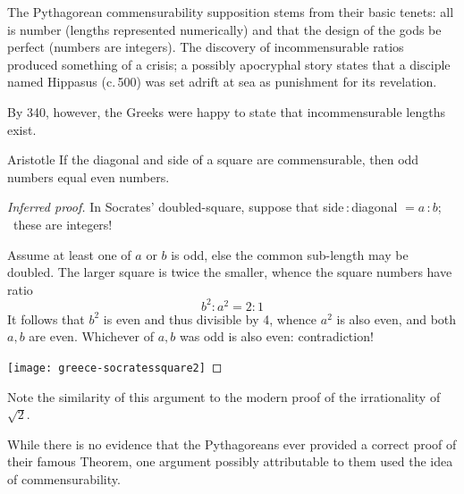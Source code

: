 The Pythagorean commensurability supposition stems from their basic tenets: all is number (lengths represented numerically) and that the design of the gods be perfect (numbers are integers). The discovery of incommensurable ratios produced something of a crisis; a possibly apocryphal story states that a disciple named Hippasus (c.\,500\BC) was set adrift at sea as punishment for its revelation.\smallbreak %

By 340\BC, however, the Greeks were happy to state that incommensurable lengths exist.

\begin{thm*}{Aristotle}
If the diagonal and side of a square are commensurable, then odd numbers equal even numbers.
\end{thm*}

\begin{proof}[Inferred proof]
In Socrates' doubled-square, suppose that side\,:\,diagonal $=a$\,:\,$b$; \ these are integers!\par
\begin{minipage}[t]{0.8\linewidth}\vspace{-5pt}
Assume at least one of $a$ or $b$ is odd, else the common sub-length may be doubled. The larger square is twice the smaller, whence the square numbers have ratio
\[b^2:a^2=2:1\]
It follows that $b^2$ is even and thus divisible by 4, whence $a^2$ is also even, and both $a,b$ are even. Whichever of $a,b$ was odd is also even: contradiction!
\end{minipage}\hfill\begin{minipage}[t]{0.18\linewidth}\vspace{-8pt}
\flushright\texttt{[image: greece-socratessquare2]}
\end{minipage}
\end{proof}
Note the similarity of this argument to the modern proof of the irrationality of $\sqrt 2$.\goodbreak

While there is no evidence that the Pythagoreans ever provided a correct proof of their famous Theorem, one argument possibly attributable to them used the idea of commensurability.

